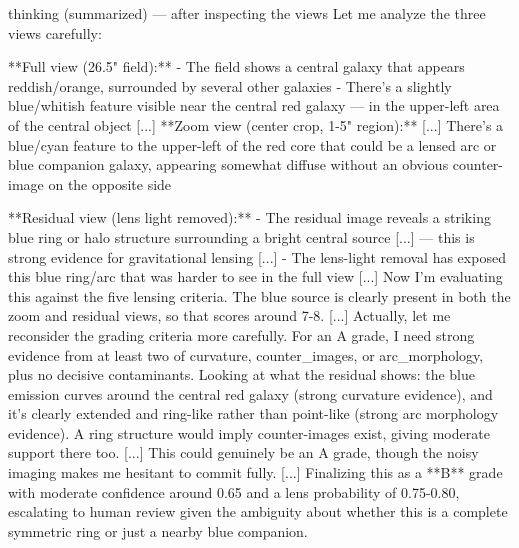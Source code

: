 \documentclass[11pt,letterpaper]{article}
\begin{document}
\begin{toolio}{thinking (summarized) --- after inspecting the views}
Let me analyze the three views carefully:

**Full view (26.5" field):**
- The field shows a central galaxy that appears reddish/orange, surrounded by several other galaxies
- There's a slightly blue/whitish feature visible near the central red galaxy — in the upper-left area of the central object
[...]
**Zoom view (center crop, 1-5" region):**
[...] There's a blue/cyan feature to the upper-left of the red core that could be a lensed arc or blue companion galaxy, appearing somewhat diffuse without an obvious counter-image on the opposite side

**Residual view (lens light removed):**
- The residual image reveals a striking blue ring or halo structure surrounding a bright central source [...] — this is strong evidence for gravitational lensing [...]
- The lens-light removal has exposed this blue ring/arc that was harder to see in the full view
[...]
Now I'm evaluating this against the five lensing criteria. The blue source is clearly present in both the zoom and residual views, so that scores around 7-8. [...] Actually, let me reconsider the grading criteria more carefully. For an A grade, I need strong evidence from at least two of curvature, counter_images, or arc_morphology, plus no decisive contaminants. Looking at what the residual shows: the blue emission curves around the central red galaxy (strong curvature evidence), and it's clearly extended and ring-like rather than point-like (strong arc morphology evidence). A ring structure would imply counter-images exist, giving moderate support there too. [...] This could genuinely be an A grade, though the noisy imaging makes me hesitant to commit fully. [...] Finalizing this as a **B** grade with moderate confidence around 0.65 and a lens probability of 0.75-0.80, escalating to human review given the ambiguity about whether this is a complete symmetric ring or just a nearby blue companion.
\end{toolio}
\end{document}
